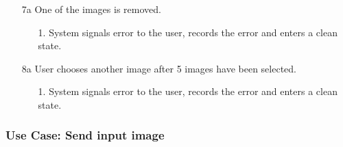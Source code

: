 \documentclass[parskip=full]{scrartcl}
\begin{document}
\begin{enumerate}
		\item[7a] One of the images is removed.
		\begin{itemize} [nosep]
			\item[1.] System signals error to the user, records the error and enters a clean state.
		\end{itemize}		
		\item[8a] User chooses another image after 5 images have been selected.
		\begin{itemize} [nosep]
			\item[1.] System signals error to the user, records the error and enters a clean state.
		\end{itemize}		
\end{enumerate}

\pagebreak


\subsubsection {Use Case: Send input image} \label {uc:sip}
\end{document}
